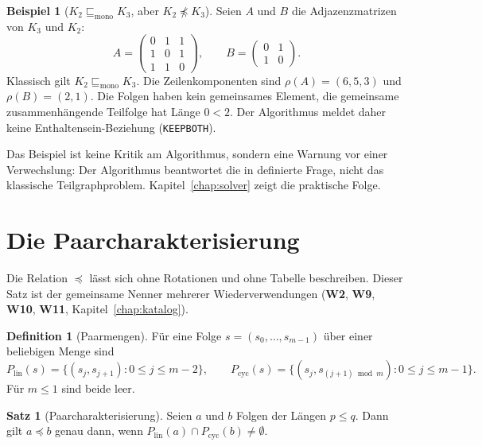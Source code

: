 \documentclass[a4paper,12pt,twoside]{report}
\DeclareRobustCommand{\_}{\textunderscore\allowbreak{}}
\theoremstyle{definition}
\newtheorem{definition}{Definition}[chapter]
\newtheorem{beispiel}{Beispiel}[chapter]
\newtheorem{satz}{Satz}[chapter]
\newcommand{\W}[1]{\textbf{W#1}}
\begin{document}
\begin{beispiel}[$K_2\sqsubseteq_{\mathrm{mono}}K_3$, aber $K_2\not\preceq K_3$]
	\label{bsp:k3k2}
	Seien $A$ und $B$ die Adjazenzmatrizen von $K_3$ und $K_2$:
	\[
	A=\begin{pmatrix}0&1&1\\1&0&1\\1&1&0\end{pmatrix},\qquad
	B=\begin{pmatrix}0&1\\1&0\end{pmatrix}.
	\]
	Klassisch gilt $K_2\sqsubseteq_{\mathrm{mono}}K_3$. Die Zeilenkomponenten sind $\rho(A)=(6,5,3)$ und $\rho(B)=(2,1)$. Die Folgen haben kein gemeinsames Element, die gemeinsame zusammenhängende Teilfolge hat Länge $0<2$. Der Algorithmus meldet daher keine Enthaltensein-Beziehung (\texttt{KEEP\_BOTH}).
\end{beispiel}
 
Das Beispiel ist keine Kritik am Algorithmus, sondern eine Warnung vor einer Verwechslung: Der Algorithmus beantwortet die in \cite{epp2026subgraph} definierte Frage, nicht das klassische Teilgraphproblem. Kapitel~\ref{chap:solver} zeigt die praktische Folge.
 
\section{Die Paarcharakterisierung}
\label{sec:paar}
 
Die Relation $\preceq$ lässt sich ohne Rotationen und ohne Tabelle beschreiben. Dieser Satz ist der gemeinsame Nenner mehrerer Wiederverwendungen (\W{2}, \W{9}, \W{10}, \W{11}, Kapitel~\ref{chap:katalog}).
 
\begin{definition}[Paarmengen]
	Für eine Folge $s=(s_0,\ldots,s_{m-1})$ über einer beliebigen Menge sind
	\[
	P_{\mathrm{lin}}(s)=\{(s_j,s_{j+1}) : 0\le j\le m-2\},\qquad
	P_{\mathrm{cyc}}(s)=\{(s_j,s_{(j+1)\bmod m}) : 0\le j\le m-1\}.
	\]
	Für $m\le 1$ sind beide leer.
\end{definition}
 
\begin{satz}[Paarcharakterisierung]
	\label{satz:paar}
	Seien $a$ und $b$ Folgen der Längen $p\le q$. Dann gilt $a\preceq b$ genau dann, wenn $P_{\mathrm{lin}}(a)\cap P_{\mathrm{cyc}}(b)\neq\emptyset$.
\end{satz}
 
\end{document}
